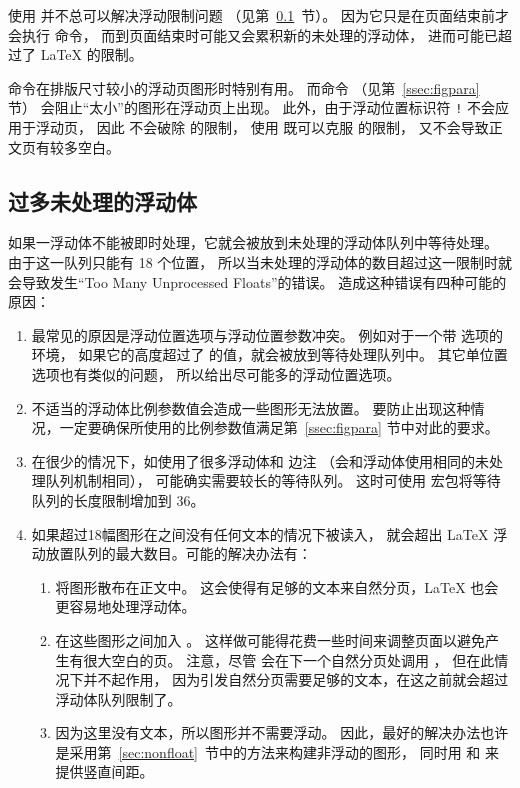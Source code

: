 \begin{description}
	使用  并不总可以解决浮动限制问题
	（见第~\ref{ssec:toomanyfig}~节）。
	因为它只是在页面结束前才会执行  命令，
	而到页面结束时可能又会累积新的未处理的浮动体，
	进而可能已超过了 \LaTeX{} 的限制。
	
	 命令在排版尺寸较小的浮动页图形时特别有用。
	而命令  （见第~\ref{ssec:figpara} 节）
	会阻止“太小”的图形在浮动页上出现。
	此外，由于浮动位置标识符 \texttt{!} 不会应用于浮动页，
	因此 \opt{[!p]} 不会破除  的限制，
	使用  既可以克服  的限制，
	又不会导致正文页有较多空白。
\end{description}


\subsection{过多未处理的浮动体}\label{ssec:toomanyfig}

如果一浮动体不能被即时处理，它就会被放到未处理的浮动体队列中等待处理。
由于这一队列只能有 18 个位置，
所以当未处理的浮动体的数目超过这一限制时就会导致发生“Too Many Unprocessed Floats”的错误。
造成这种错误有四种可能的原因：

\begin{enumerate}
	\item 最常见的原因是浮动位置选项与浮动位置参数冲突。
	例如对于一个带 \opt{[t]} 选项的  环境，
	如果它的高度超过了  的值，就会被放到等待处理队列中。
	其它单位置选项也有类似的问题，
	所以给出尽可能多的浮动位置选项。

	\item 不适当的浮动体比例参数值会造成一些图形无法放置。
	要防止出现这种情况，一定要确保所使用的比例参数值满足第~\ref{ssec:figpara} 节中对此的要求。

	\item 在很少的情况下，如使用了很多浮动体和  边注
	（会和浮动体使用相同的未处理队列机制相同），
	可能确实需要较长的等待队列。
	这时可使用  宏包将等待队列的长度限制增加到 36。

	\item 如果超过18幅图形在之间没有任何文本的情况下被读入，
	就会超出 \LaTeX{} 浮动放置队列的最大数目。可能的解决办法有：
	
	\begin{enumerate}
		\item 将图形散布在正文中。
		这会使得有足够的文本来自然分页，\LaTeX{} 也会更容易地处理浮动体。
		\item 在这些图形之间加入 。
		这样做可能得花费一些时间来调整页面以避免产生有很大空白的页。
		注意，尽管  会在下一个自然分页处调用 ，
		但在此情况下并不起作用，
		因为引发自然分页需要足够的文本，在这之前就会超过浮动体队列限制了。
		\item 因为这里没有文本，所以图形并不需要浮动。
		因此，最好的解决办法也许是采用第~\ref{sec:nonfloat}~节中的方法来构建非浮动的图形，
		同时用  和  来提供竖直间距。
	\end{enumerate}
\end{enumerate}


